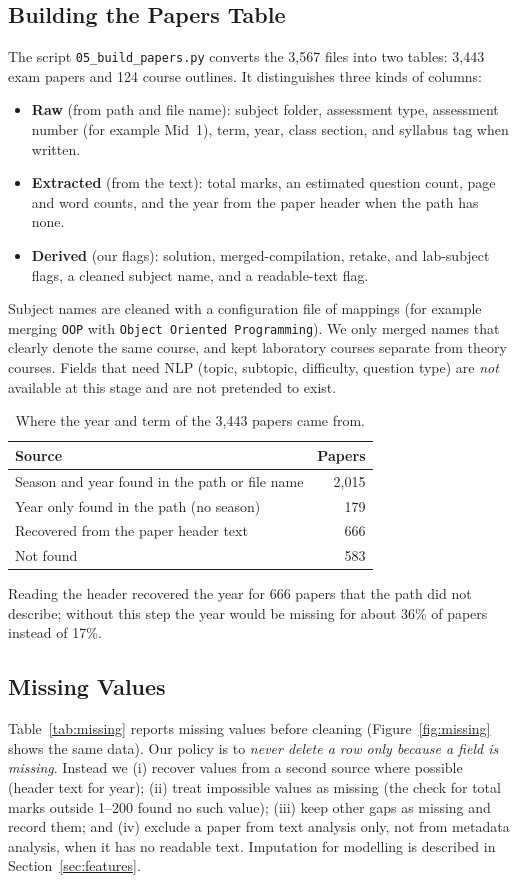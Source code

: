 \documentclass[11pt,a4paper]{article}
\newcommand{\file}[1]{\texttt{#1}}
\begin{document}
\subsection{Building the Papers Table}
The script \file{05\_build\_papers.py} converts the 3{,}567 files into two tables: 3{,}443 exam papers and 124 course outlines. It distinguishes three kinds of columns:
\begin{itemize}
  \item \textbf{Raw} (from path and file name): subject folder, assessment type, assessment number (for example Mid~1), term, year, class section, and syllabus tag when written.
  \item \textbf{Extracted} (from the text): total marks, an estimated question count, page and word counts, and the year from the paper header when the path has none.
  \item \textbf{Derived} (our flags): solution, merged-compilation, retake, and lab-subject flags, a cleaned subject name, and a readable-text flag.
\end{itemize}
Subject names are cleaned with a configuration file of mappings (for example merging \texttt{OOP} with \texttt{Object Oriented Programming}). We only merged names that clearly denote the same course, and kept laboratory courses separate from theory courses. Fields that need NLP (topic, subtopic, difficulty, question type) are \emph{not} available at this stage and are not pretended to exist.

\begin{table}[H]
\centering
\caption{Where the year and term of the 3{,}443 papers came from.}
\label{tab:termsource}
\begin{tabular}{lr}
\toprule
Source & Papers \\
\midrule
Season and year found in the path or file name & 2{,}015 \\
Year only found in the path (no season) & 179 \\
Recovered from the paper header text & 666 \\
Not found & 583 \\
\bottomrule
\end{tabular}
\end{table}

Reading the header recovered the year for 666 papers that the path did not describe; without this step the year would be missing for about 36\% of papers instead of 17\%.

\subsection{Missing Values}
\label{sec:missing}
Table~\ref{tab:missing} reports missing values before cleaning (Figure~\ref{fig:missing} shows the same data). Our policy is to \emph{never delete a row only because a field is missing}. Instead we (i) recover values from a second source where possible (header text for year); (ii) treat impossible values as missing (the check for total marks outside 1--200 found no such value); (iii) keep other gaps as missing and record them; and (iv) exclude a paper from text analysis only, not from metadata analysis, when it has no readable text. Imputation for modelling is described in Section~\ref{sec:features}.
\end{document}
